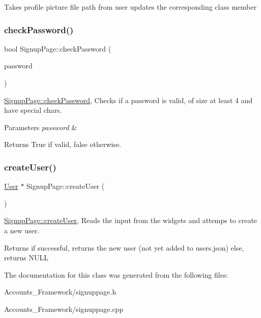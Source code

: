 Takes profile picture file path from user updates the corresponding class member \mbox{\label{classSignupPage_afe8c63473a69b4763c1cbe9aaafbe895}} 
\subsubsection{\texorpdfstring{check\+Password()}{checkPassword()}}
{\footnotesize\ttfamily bool Signup\+Page\+::check\+Password (\begin{DoxyParamCaption}\item[{Q\+String}]{password }\end{DoxyParamCaption})}



\hyperlink{classSignupPage_afe8c63473a69b4763c1cbe9aaafbe895}{Signup\+Page\+::check\+Password}, Checks if a password is valid, of size at least 4 and have special chars. 


\begin{DoxyParams}{Parameters}
{\em password} & \\
\hline
\end{DoxyParams}
\begin{DoxyReturn}{Returns}
True if valid, false otherwise. 
\end{DoxyReturn}
\mbox{\label{classSignupPage_ac6f433285ca77bcfa6bae1d3b37cd5b5}} 
\subsubsection{\texorpdfstring{create\+User()}{createUser()}}
{\footnotesize\ttfamily \hyperlink{classUser}{User} $\ast$ Signup\+Page\+::create\+User (\begin{DoxyParamCaption}{ }\end{DoxyParamCaption})}



\hyperlink{classSignupPage_ac6f433285ca77bcfa6bae1d3b37cd5b5}{Signup\+Page\+::create\+User}, Reads the input from the widgets and attemps to create a new user. 

\begin{DoxyReturn}{Returns}
if successful, returns the new user (not yet added to users.\+json) else, returns N\+U\+LL 
\end{DoxyReturn}


The documentation for this class was generated from the following files\+:\begin{DoxyCompactItemize}
\item 
Accounts\+\_\+\+Framework/signuppage.\+h\item 
Accounts\+\_\+\+Framework/signuppage.\+cpp\end{DoxyCompactItemize}
